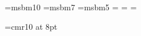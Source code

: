 

\font\msbmnormal=msbm10
\font\msbmpeq=msbm7
\font\msbmmuypeq=msbm5
\newfam\numeros
\textfont\numeros=\msbmnormal
\scriptfont\numeros=\msbmpeq
\scriptscriptfont\numeros=\msbmmuypeq
\def\num{\fam\numeros\msbmnormal}
\def\R{{\num R}}

\font\rmdiez=cmr10 at 8pt

\def\proof{\hbox{\it Proof.\enspace}}
\def\por{\thinspace}

%
%
%
%
%
%
%
%
%
%

